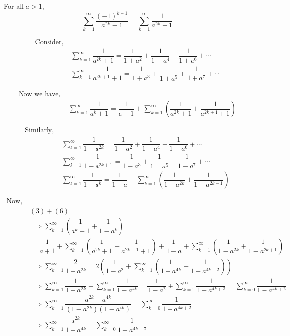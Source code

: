 \documentclass[12pt, a4paper]{article}
\begin{document}
For all $a > 1$,
\[
\sum_{k=1}^{\infty}\dfrac{(-1)^{k+1}}{a^{2k}-1} = \sum_{k=1}^{\infty}\dfrac{1}{a^{2k}+1}
\]

\begin{align}
    \text{Consider, } \nonumber &\\ 
    & \sum_{k=1}^{\infty}\dfrac{1}{a^{2k}+1} = \dfrac{1}{1+a^2} + \dfrac{1}{1+a^4} + \dfrac{1}{1+a^6} + \cdots \\
    & \sum_{k=1}^{\infty}\dfrac{1}{a^{2k+1}+1} = \dfrac{1}{1+a^3} + \dfrac{1}{1+a^5} + \dfrac{1}{1+a^7} + \cdots
\end{align}

\begin{align}
    \text{Now we have, } \nonumber & \\
    & \sum_{k=1}^{\infty}\dfrac{1}{a^{k}+1} = \dfrac{1}{a+1} + \sum_{k=1}^{\infty} \left(\dfrac{1}{a^{2k}+1} + \dfrac{1}{a^{2k+1}+1}\right)
\end{align}

\begin{align}
    \text{Similarly, } \nonumber & \\
    & \sum_{k=1}^{\infty}\dfrac{1}{1-a^{2k}} = \dfrac{1}{1-a^2} + \dfrac{1}{1-a^4} + \dfrac{1}{1-a^6} + \cdots \\
    & \sum_{k=1}^{\infty}\dfrac{1}{1-a^{2k+1}} = \dfrac{1}{1-a^3} + \dfrac{1}{1-a^5} + \dfrac{1}{1-a^7} + \cdots \\
    & \sum_{k=1}^{\infty}\dfrac{1}{1-a^{k}} = \dfrac{1}{1-a} + \sum_{k=1}^{\infty} \left(\dfrac{1}{1-a^{2k}} + \dfrac{1}{1-a^{2k+1}}\right)
\end{align}

\begin{align*}
    \text{Now, } \\
    & (3) + (6) \\
    &\implies \sum_{k=1}^{\infty} \left( \dfrac{1}{a^{k}+1} + \dfrac{1}{1-a^{k}} \right) \\&= \dfrac{1}{a+1} + \sum_{k=1}^{\infty} \left(\dfrac{1}{a^{2k}+1} + \dfrac{1}{a^{2k+1}+1}\right) + \dfrac{1}{1-a} + \sum_{k=1}^{\infty} \left(\dfrac{1}{1-a^{2k}} + \dfrac{1}{1-a^{2k+1}}\right) \\
    & \implies \sum_{k=1}^{\infty} \dfrac{2}{1-a^{2k}} = 2 \left( \dfrac{1}{1-a^2} + \sum_{k=1}^{\infty} \left( \dfrac{1}{1-a^{4k}} + \dfrac{1}{1-a^{4k+2}} \right) \right) \\
    & \implies \sum_{k=1}^{\infty} \dfrac{1}{1-a^{2k}} - \sum_{k=1}^{\infty} \dfrac{1}{1-a^{4k}} = \dfrac{1}{1-a^2} + \sum_{k=1}^{\infty} \dfrac{1}{1-a^{4k+2}} = \sum_{k=0}^{\infty} \dfrac{1}{1-a^{4k+2}}\\
    & \implies \sum_{k=1}^{\infty} \dfrac{a^{2k}-a^{4k}}{(1-a^{2k})(1-a^{4k})} = \sum_{k=0}^{\infty} \dfrac{1}{1-a^{4k+2}} \\
    & \implies \sum_{k=1}^{\infty} \dfrac{a^{2k}}{1-a^{4k}} = \sum_{k=0}^{\infty} \dfrac{1}{1-a^{4k+2}} \tag{7} \\
\end{align*}
\end{document}
